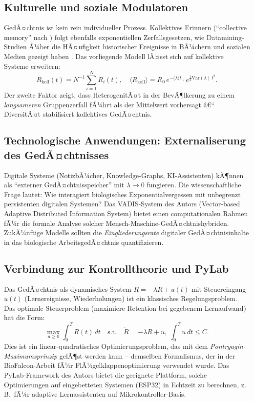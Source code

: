 ﻿\documentclass[12pt,a4paper,twoside]{article}
\theoremstyle{theormstyle}
\theoremstyle{proofstyle}
\begin{document}
	\subsection{Kulturelle und soziale Modulatoren}
	
	GedÃ¤chtnis ist kein rein individueller Prozess. Kollektives Erinnern
	(``collective memory'' nach \citealt{halbwachs1992}) folgt ebenfalls
	exponentiellen Zerfallsgesetzen, wie Datamining-Studien Ã¼ber die
	HÃ¤ufigkeit historischer Ereignisse in BÃ¼chern und sozialen Medien
	gezeigt haben \citep{michel2011quantitative}.
	Das vorliegende Modell lÃ¤sst sich auf kollektive Systeme erweitern:
	\[
	R_{\mathrm{koll}}(t) = N^{-1}\sum_{i=1}^N R_i(t),
	\quad \langle R_{\mathrm{koll}} \rangle = R_0\,e^{-\langle\lambda\rangle t}
	\cdot e^{\frac{1}{2}\mathrm{Var}(\lambda)\,t^2}.
	\]
	Der zweite Faktor zeigt, dass HeterogenitÃ¤t in der BevÃ¶lkerung
	zu einem \emph{langsameren} Gruppenzerfall fÃ¼hrt als der Mittelwert
	vorhersagt â€“ DiversitÃ¤t stabilisiert kollektives GedÃ¤chtnis.
	
	\subsection{Technologische Anwendungen: Externaliserung des GedÃ¤chtnisses}
	
	Digitale Systeme (NotizbÃ¼cher, Knowledge-Graphs, KI-Assistenten)
	kÃ¶nnen als ``externer GedÃ¤chtnisspeicher'' mit $\lambda \to 0$ fungieren.
	Die wissenschaftliche Frage lautet: Wie interagiert biologisches
	Exponentialvergessen mit unbegrenzt persistenten digitalen Systemen?
	Das VADIS-System des Autors \citep{epp2026vadis} (Vector-based Adaptive
	Distributed Information System) bietet einen computationalen Rahmen
	fÃ¼r die formale Analyse solcher Mensch-Maschine-GedÃ¤chtnishybriden.
	ZukÃ¼nftige Modelle sollten die \emph{Eingliederungsrate} digitaler
	GedÃ¤chtnisinhalte in das biologische ArbeitsgedÃ¤chtnis quantifizieren.
	
	\subsection{Verbindung zur Kontrolltheorie und PyLab}
	
	Das GedÃ¤chtnis als dynamisches System $\dot{R} = -\lambda R + u(t)$
	mit Steuereingang $u(t)$ (Lernereignisse, Wiederholungen) ist ein
	klassisches Regelungsproblem. Das optimale Steuerproblem
	(maximiere Retention bei gegebenem Lernaufwand) hat die Form:
	\[
	\max_{u \geq 0}\int_0^T R(t)\,dt
	\quad\text{s.t.}\quad \dot{R} = -\lambda R + u,\;
	\int_0^T u\,dt \leq C.
	\]
	Dies ist ein linear-quadratisches Optimierungsproblem, das mit
	dem \emph{Pontryagin-Maxi\-mumsprinzip} gelÃ¶st werden kann -- demselben
	Formalismus, der in der BioFalcon-Arbeit \citep{epp2026biofalcon}
	fÃ¼r FlÃ¼gelklappenoptimierung verwendet wurde. Das PyLab-Framework des
	Autors bietet die geeignete Plattform, solche Optimierungen auf
	eingebetteten Systemen (ESP32) in Echtzeit zu berechnen, z.\,B.\ fÃ¼r
	adaptive Lernassistenten auf Mikrokontroller-Basis.
	
\end{document}
